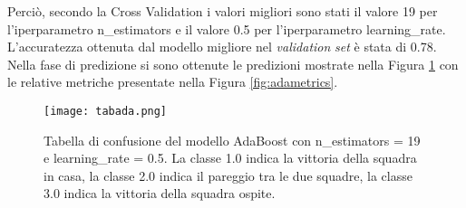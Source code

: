 Perciò, secondo la Cross Validation i valori migliori sono stati il valore 19 per l'iperparametro \textsf{n\_estimators} e il valore 0.5 per l'iperparametro \textsf{learning\_rate}. L'accuratezza ottenuta dal modello migliore nel \emph{validation} \emph{set} è stata di 0.78.\\
Nella fase di predizione si sono ottenute le predizioni mostrate nella Figura \ref{fig:tabada} con le relative metriche presentate nella Figura \ref{fig:adametrics}.
\begin{figure}[h]
	\begin{center}
		\texttt{[image: tabada.png]}
		\caption{Tabella di confusione del modello AdaBoost con \textsf{n\_estimators} = 19 e \textsf{learning\_rate} = 0.5. La classe 1.0 indica la vittoria della squadra in casa, la classe 2.0 indica il pareggio tra le due squadre, la classe 3.0 indica la vittoria della squadra ospite.
		} 
		\label{fig:tabada}
	\end{center}
\end{figure}

